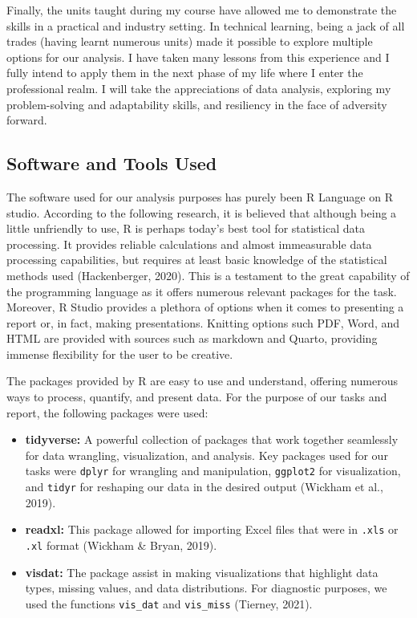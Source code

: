 \documentclass[
]{article}
\begin{document}
Finally, the units taught during my course have allowed me to demonstrate the skills in a practical and industry setting. In technical learning, being a jack of all trades (having learnt numerous units) made it possible to explore multiple options for our analysis. I have taken many lessons from this experience and I fully intend to apply them in the next phase of my life where I enter the professional realm. I will take the appreciations of data analysis, exploring my problem-solving and adaptability skills, and resiliency in the face of adversity forward.

\subsection{Software and Tools Used}\label{software-and-tools-used}

The software used for our analysis purposes has purely been R Language on R studio. According to the following research, it is believed that although being a little unfriendly to use, R is perhaps today's best tool for statistical data processing. It provides reliable calculations and almost immeasurable data processing capabilities, but requires at least basic knowledge of the statistical methods used (Hackenberger, 2020). This is a testament to the great capability of the programming language as it offers numerous relevant packages for the task. Moreover, R Studio provides a plethora of options when it comes to presenting a report or, in fact, making presentations. Knitting options such PDF, Word, and HTML are provided with sources such as markdown and Quarto, providing immense flexibility for the user to be creative.

The packages provided by R are easy to use and understand, offering numerous ways to process, quantify, and present data. For the purpose of our tasks and report, the following packages were used:

\begin{itemize}
\item
  \textbf{tidyverse:} A powerful collection of packages that work together seamlessly for data wrangling, visualization, and analysis. Key packages used for our tasks were \texttt{dplyr} for wrangling and manipulation, \texttt{ggplot2} for visualization, and \texttt{tidyr} for reshaping our data in the desired output (Wickham et al., 2019).
\item
  \textbf{readxl:} This package allowed for importing Excel files that were in \texttt{.xls} or \texttt{.xl} format (Wickham \& Bryan, 2019).
\item
  \textbf{visdat:} The package assist in making visualizations that highlight data types, missing values, and data distributions. For diagnostic purposes, we used the functions \texttt{vis\_dat} and \texttt{vis\_miss} (Tierney, 2021).
\end{itemize}
\end{document}

